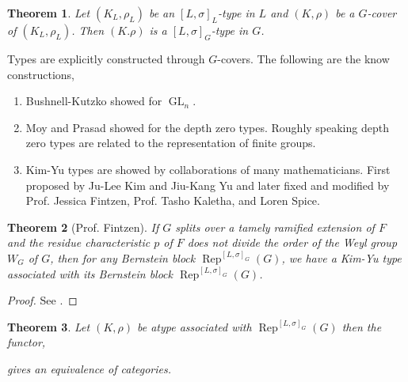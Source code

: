 \documentclass[8pt]{article}
\newtheorem{theorem}{Theorem} [section]
\DeclareMathOperator{\cind}{c-ind}
\DeclareMathOperator{\GL}{GL}
\DeclareMathOperator{\Rep}{Rep}
\DeclareMathOperator{\Hom}{Hom}
\DeclareMathOperator{\End}{End}
\DeclareMathOperator{\Mod}{Mod}
\begin{document}
\begin{theorem}
  \label{theorem_117}
  Let $(K_L,\rho_L)$ be an $[L,\sigma]_L$-type in $L$ and $(K,\rho)$ be a $G$-cover of $(K_L,\rho_L)$. Then $(K.\rho)$ is a $[L,\sigma]_G$-type in $G$.
  \begin{center}
  \end{center}
\end{theorem}

Types are explicitly constructed through $G$-covers. The following are the know constructions,
\begin{enumerate}
  \item Bushnell-Kutzko showed for $\GL_n$.
  \item Moy and Prasad showed for the depth zero types. Roughly speaking depth zero types are related to the representation of finite groups.
  \item Kim-Yu types are showed by collaborations of many mathematicians. First proposed by Ju-Lee Kim and Jiu-Kang Yu and later fixed and modified by Prof. Jessica Fintzen, Prof. Tasho Kaletha, and Loren Spice.
\end{enumerate}

\begin{theorem}[Prof. Fintzen]
  If $G$ splits over a tamely ramified extension of $F$ and the residue characteristic $p$ of $F$ does not divide the order of the Weyl group $W_G$ of $G$, then for any Bernstein block $\Rep^{[L,\sigma]_G}(G)$, we have a Kim-Yu type associated with its Bernstein block $\Rep^{[L,\sigma]_G}(G)$.
\end{theorem}

\begin{proof}
  See \cite{Fintzen}.
\end{proof}

\begin{theorem}
  \label{theorem_119}
  Let $(K,\rho)$ be atype associated with $\Rep^{[L,\sigma]_G}(G)$ then the functor,
  \begin{center}
  \end{center}
  gives an equivalence of categories.
\end{theorem}
\end{document}
